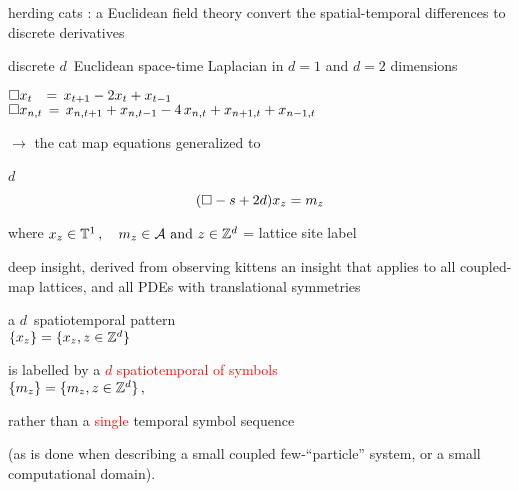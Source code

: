 \begin{frame}{herding cats : a Euclidean field theory}
convert the spatial-temporal differences to discrete derivatives

\bigskip

discrete $d$\dmn\ Euclidean space-time Laplacian
in $d=1$ and $d=2$ dimensions

\bigskip

\(
\Box x_t \;\;\,=\, x_{t+1} - 2x_{t} + x_{t-1}
\)\\ \(
\Box x_{n,t} \,=\, x_{n,t+1} + x_{n,t-1}
- 4 \, x_{n,t} + x_{n+1,t} + x_{n-1, t}
\)

\medskip

$\to$ the cat map equations generalized  to
\begin{block}{$d$\dmn\ \catlatt}
\[
 (\Box -s+2d)x_{z} = m_z
\] %

\medskip

\end{block}

\bigskip

where
\(
  x_{z} \in  \mathbb{T}^{1}
    \,, \quad
  {\ensuremath{m_{z}}} \in \mathcal{A}
    \mbox{  and  }
  z\in \mathbb{Z}^{d}
\) = lattice site label
\end{frame}

\begin{frame}{deep insight, derived from observing kittens}
an insight that applies
to all coupled-map lattices, and all PDEs with translational symmetries

\bigskip

a $d$\dmn\ spatiotemporal pattern\\
\(
\{x_{z}\} = \{x_{z},  z\in \mathbb{Z}^{d}  \}
\)

\bigskip

is labelled by a \textcolor{red}{{\em $d$\dmn} spatiotemporal {\brick} of symbols}\\
\(
\{m_{z}\} = \{m_{z}, z\in \mathbb{Z}^{d}\}
\,,
\)

\bigskip

rather than a \textcolor{red}{single} temporal symbol sequence


\bigskip

(as is done
when describing a small coupled few-``particle'' system, or a small
computational domain).
\end{frame}


